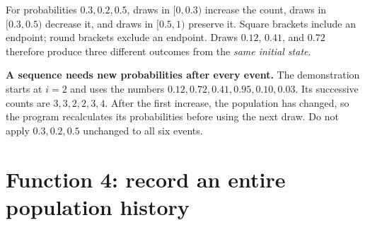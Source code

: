 For probabilities \(0.3,0.2,0.5\), draws in \([0,0.3)\) increase the count, draws in \([0.3,0.5)\) decrease it, and draws in \([0.5,1)\) preserve it. Square brackets include an endpoint; round brackets exclude an endpoint. Draws \(0.12\), \(0.41\), and \(0.72\) therefore produce three different outcomes from the \emph{same initial state}.

\begin{workedexample}
\textbf{A sequence needs new probabilities after every event.} The demonstration starts at \(i=2\) and uses the numbers \(0.12,0.72,0.41,0.95,0.10,0.03\). Its successive counts are \(3,3,2,2,3,4\). After the first increase, the population has changed, so the program recalculates its probabilities before using the next draw. Do not apply \(0.3,0.2,0.5\) unchanged to all six events.
\end{workedexample}

\section{Function 4: record an entire population history}



